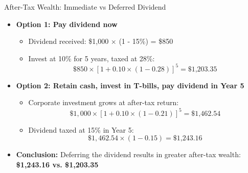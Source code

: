 \begin{frame}{After-Tax Wealth: Immediate vs Deferred Dividend}
    \begin{itemize}
        \item \textbf{Option 1: Pay dividend now}
        \begin{itemize}
            \item Dividend received: \$1,000 × (1 - 15\%) = \$850
            \item Invest at 10\% for 5 years, taxed at 28\%:
            \[
            \$850 \times \left[1 + 0.10 \times (1 - 0.28)\right]^5 = \text{\$1,203.35}
            \]
        \end{itemize}

        \vspace{0.3cm}
        \item \textbf{Option 2: Retain cash, invest in T-bills, pay dividend in Year 5}
        \begin{itemize}
            \item Corporate investment grows at after-tax return:
            \[
            \$1,000 \times \left[1 + 0.10 \times (1 - 0.21)\right]^5 = \text{\$1,462.54}
            \]
            \item Dividend taxed at 15\% in Year 5:
            \[
            \$1,462.54 \times (1 - 0.15) = \text{\$1,243.16}
            \]
        \end{itemize}

        \vspace{0.3cm}
        \item \textbf{Conclusion:} Deferring the dividend results in greater after-tax wealth:  
        \textbf{\$1,243.16 vs. \$1,203.35}
    \end{itemize}
\end{frame}

